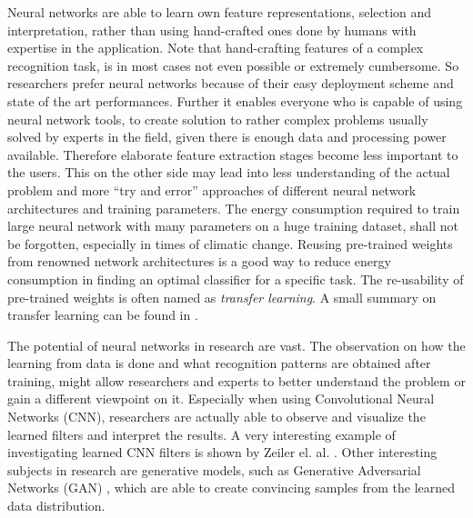 Neural networks are able to learn own feature representations, selection and interpretation, rather than using hand-crafted ones done by humans with expertise in the application.
Note that hand-crafting features of a complex recognition task, is in most cases not even possible or extremely cumbersome.
So researchers prefer neural networks because of their easy deployment scheme and state of the art performances.
Further it enables everyone who is capable of using neural network tools, to create solution to rather complex problems usually solved by experts in the field, given there is enough data and processing power available.
Therefore elaborate feature extraction stages become less important to the users.
This on the other side may lead into less understanding of the actual problem and more \enquote{try and error} approaches of different neural network architectures and training parameters.
The energy consumption required to train large neural network with many parameters on a huge training dataset, shall not be forgotten, especially in times of climatic change.
Reusing pre-trained weights from renowned network architectures is a good way to reduce energy consumption in finding an optimal classifier for a specific task.
The re-usability of pre-trained weights is often named as \emph{transfer learning}. 
A small summary on transfer learning can be found in \cite{TransferLearning}.

The potential of neural networks in research are vast.
The observation on how the learning from data is done and what recognition patterns are obtained after training, might allow researchers and experts to better understand the problem or gain a different viewpoint on it.
Especially when using Convolutional Neural Networks (CNN), researchers are actually able to observe and visualize the learned filters and interpret the results.
A very interesting example of investigating learned CNN filters is shown by Zeiler el. al. \cite{Zeiler2013}.
Other interesting subjects in research are generative models, such as Generative Adversarial Networks (GAN) \cite{Goodfellow2014}, which are able to create convincing samples from the learned data distribution.

